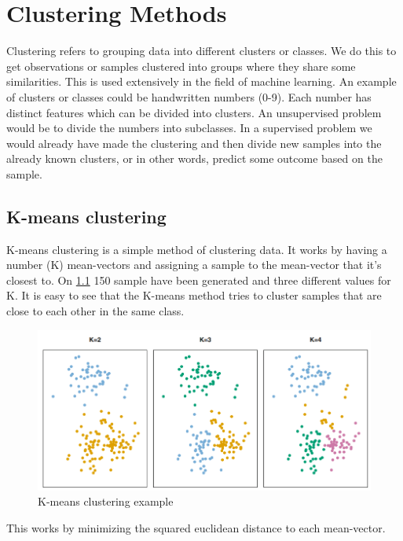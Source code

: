 

\chapter{Clustering Methods}
Clustering refers to grouping data into different clusters or classes. We do this to get observations or samples clustered into groups where they share some similarities. This is used extensively in the field of machine learning. An example of clusters or classes could be handwritten numbers (0-9). Each number has distinct features which can be divided into clusters. An unsupervised problem would be to divide the numbers into subclasses. In a supervised problem we would already have made the clustering and then divide new samples into the already known clusters, or in other words, predict some outcome based on the sample.

\section{K-means clustering}
K-means clustering is a simple method of clustering data. It works by having a number (K) mean-vectors and assigning a sample to the mean-vector that it's closest to. On \cref{fig:k-means_clustering} 150 sample have been generated and three different values for K. It is easy to see that the K-means method tries to cluster samples that are close to each other in the same class.

\begin{figure}[H]
	\centering
	\includegraphics[width=12cm]{Img/K-means_clustering.PNG}
	\caption{K-means clustering example}
	\label{fig:k-means_clustering}
\end{figure} 

This works by minimizing the squared euclidean distance to each mean-vector. 

